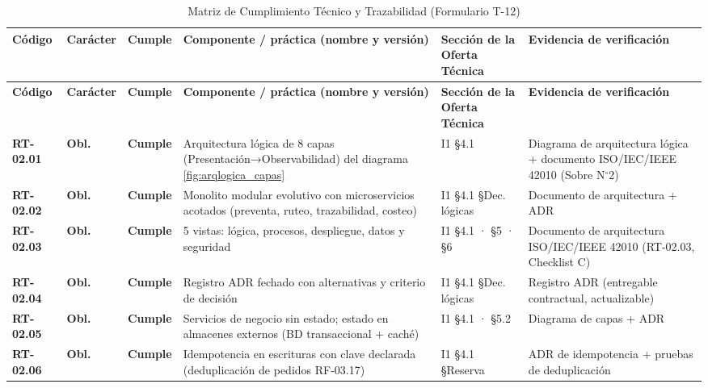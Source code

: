\begin{small}
\begin{longtable}{@{}p{1.35cm} p{1.15cm} p{1.15cm} p{4.6cm} p{2.35cm} p{3.8cm}@{}}
\caption{Matriz de Cumplimiento Técnico y Trazabilidad (Formulario T-12)\label{tab:t12}}\\
\toprule
\textbf{Código} & \textbf{Carácter} & \textbf{Cumple} & \textbf{Componente / práctica (nombre y versión)} & \textbf{Sección de la Oferta Técnica} & \textbf{Evidencia de verificación} \\
\midrule
\endfirsthead
\toprule
\textbf{Código} & \textbf{Carácter} & \textbf{Cumple} & \textbf{Componente / práctica (nombre y versión)} & \textbf{Sección de la Oferta Técnica} & \textbf{Evidencia de verificación} \\
\midrule
\endhead
\bottomrule
\endlastfoot
\textbf{RT-02.01} & \textbf{Obl.} & \textbf{Cumple} & Arquitectura l\'ogica de 8 capas (Presentaci\'on→Observabilidad) del diagrama \ref{fig:arqlogica_capas} & I1 §4.1 & Diagrama de arquitectura l\'ogica + documento ISO/IEC/IEEE 42010 (Sobre N$^{\circ}$2) \\
\textbf{RT-02.02} & \textbf{Obl.} & \textbf{Cumple} & Monolito modular evolutivo con microservicios acotados (preventa, ruteo, trazabilidad, costeo) & I1 §4.1 §Dec. l\'ogicas & Documento de arquitectura + ADR \\
\textbf{RT-02.03} & \textbf{Obl.} & \textbf{Cumple} & 5 vistas: l\'ogica, procesos, despliegue, datos y seguridad & I1 §4.1 · §5 · §6 & Documento de arquitectura ISO/IEC/IEEE 42010 (RT-02.03, Checklist C) \\
\textbf{RT-02.04} & \textbf{Obl.} & \textbf{Cumple} & Registro ADR fechado con alternativas y criterio de decisi\'on & I1 §4.1 §Dec. l\'ogicas & Registro ADR (entregable contractual, actualizable) \\
\textbf{RT-02.05} & \textbf{Obl.} & \textbf{Cumple} & Servicios de negocio sin estado; estado en almacenes externos (BD transaccional + cach\'e) & I1 §4.1 · §5.2 & Diagrama de capas + ADR \\
\textbf{RT-02.06} & \textbf{Obl.} & \textbf{Cumple} & Idempotencia en escrituras con clave declarada (deduplicaci\'on de pedidos RF-03.17) & I1 §4.1 §Reserva & ADR de idempotencia + pruebas de deduplicaci\'on \\

\end{longtable}
\end{small}
